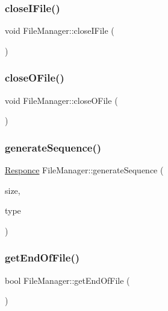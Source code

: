 \subsubsection{\texorpdfstring{close\+I\+File()}{closeIFile()}}
{\footnotesize\ttfamily void File\+Manager\+::close\+I\+File (\begin{DoxyParamCaption}{ }\end{DoxyParamCaption})}

\hypertarget{class_file_manager_a6a1f1ddbf047fc7e9531f483e4c62148}{}\label{class_file_manager_a6a1f1ddbf047fc7e9531f483e4c62148} 
\subsubsection{\texorpdfstring{close\+O\+File()}{closeOFile()}}
{\footnotesize\ttfamily void File\+Manager\+::close\+O\+File (\begin{DoxyParamCaption}{ }\end{DoxyParamCaption})}

\hypertarget{class_file_manager_a654c8bf606626cd419f5828839cb21a1}{}\label{class_file_manager_a654c8bf606626cd419f5828839cb21a1} 
\subsubsection{\texorpdfstring{generate\+Sequence()}{generateSequence()}}
{\footnotesize\ttfamily \hyperlink{_structures_8h_a9864d6ef28dd6e38416afac4426b3491}{Responce} File\+Manager\+::generate\+Sequence (\begin{DoxyParamCaption}\item[{long long}]{size,  }\item[{\hyperlink{_structures_8h_a76639e910448c3333d0f4d204e53c2c1}{Seq\+Type}}]{type }\end{DoxyParamCaption})}

\hypertarget{class_file_manager_a49df99509ff2700e0e5edd06adca345c}{}\label{class_file_manager_a49df99509ff2700e0e5edd06adca345c} 
\subsubsection{\texorpdfstring{get\+End\+Of\+File()}{getEndOfFile()}}
{\footnotesize\ttfamily bool File\+Manager\+::get\+End\+Of\+File (\begin{DoxyParamCaption}{ }\end{DoxyParamCaption})}

